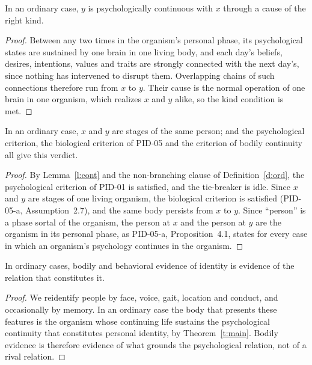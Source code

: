\documentclass{situationist-preprint}
\begin{document}
\begin{lemma}\label{l:cont}
In an ordinary case, $y$ is psychologically continuous with $x$ through a cause of the right kind.
\end{lemma}

\begin{proof}
Between any two times in the organism's personal phase, its psychological states are sustained by one brain in one living body, and each day's beliefs, desires, intentions, values and traits are strongly connected with the next day's, since nothing has intervened to disrupt them. Overlapping chains of such connections therefore run from $x$ to $y$. Their cause is the normal operation of one brain in one organism, which realizes $x$ and $y$ alike, so the kind condition is met.
\end{proof}

\begin{theorem}\label{t:main}
In an ordinary case, $x$ and $y$ are stages of the same person; and the psychological criterion, the biological criterion of PID-05 and the criterion of bodily continuity all give this verdict.
\end{theorem}

\begin{proof}
By Lemma~\ref{l:cont} and the non-branching clause of Definition~\ref{d:ord}, the psychological criterion of PID-01 is satisfied, and the tie-breaker is idle. Since $x$ and $y$ are stages of one living organism, the biological criterion is satisfied (PID-05-a, Assumption~2.7), and the same body persists from $x$ to $y$. Since \enquote{person} is a phase sortal of the organism, the person at $x$ and the person at $y$ are the organism in its personal phase, as PID-05-a, Proposition~4.1, states for every case in which an organism's psychology continues in the organism.
\end{proof}

\begin{corollary}\label{c:evidence}
In ordinary cases, bodily and behavioral evidence of identity is evidence of the relation that constitutes it.
\end{corollary}

\begin{proof}
We reidentify people by face, voice, gait, location and conduct, and occasionally by memory. In an ordinary case the body that presents these features is the organism whose continuing life sustains the psychological continuity that constitutes personal identity, by Theorem~\ref{t:main}. Bodily evidence is therefore evidence of what grounds the psychological relation, not of a rival relation.
\end{proof}
\end{document}
